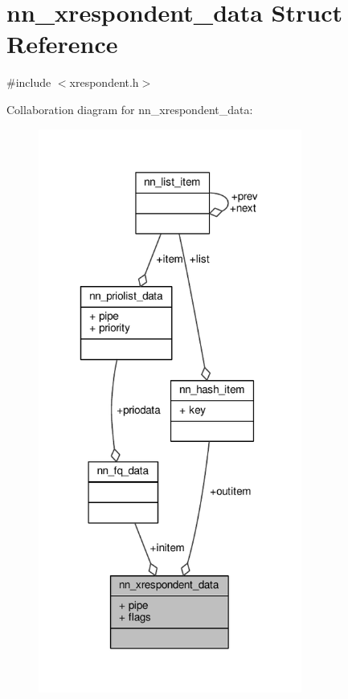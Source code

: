 \hypertarget{structnn__xrespondent__data}{}\section{nn\+\_\+xrespondent\+\_\+data Struct Reference}
\label{structnn__xrespondent__data}


{\ttfamily \#include $<$xrespondent.\+h$>$}



Collaboration diagram for nn\+\_\+xrespondent\+\_\+data\+:\nopagebreak
\begin{figure}[H]
\begin{center}
\leavevmode
\includegraphics[width=245pt]{structnn__xrespondent__data__coll__graph}
\end{center}
\end{figure}
